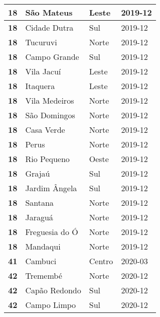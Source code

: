 \begin{table}[H]
\begin{tabular}{l|l|l|l}
	\textbf{18} & São Mateus & Leste & 2019-12\\ \hline
	\textbf{18} & Cidade Dutra & Sul & 2019-12\\ \hline
	\textbf{18} & Tucuruvi & Norte & 2019-12\\ \hline
	\textbf{18} & Campo Grande & Sul & 2019-12\\ \hline
	\textbf{18} & Vila Jacuí & Leste & 2019-12\\ \hline
	\textbf{18} & Itaquera & Leste & 2019-12\\ \hline
	\textbf{18} & Vila Medeiros & Norte & 2019-12\\ \hline
	\textbf{18} & São Domingos & Norte & 2019-12\\ \hline
	\textbf{18} & Casa Verde & Norte & 2019-12\\ \hline
	\textbf{18} & Perus & Norte & 2019-12\\ \hline
	\textbf{18} & Rio Pequeno & Oeste & 2019-12\\ \hline
	\textbf{18} & Grajaú & Sul & 2019-12\\ \hline
	\textbf{18} & Jardim Ângela & Sul & 2019-12\\ \hline
	\textbf{18} & Santana & Norte & 2019-12\\ \hline
	\textbf{18} & Jaraguá & Norte & 2019-12\\ \hline
	\textbf{18} & Freguesia do Ó & Norte & 2019-12\\ \hline
	\textbf{18} & Mandaqui & Norte & 2019-12\\ \hline
	\textbf{41} & Cambuci & Centro & 2020-03\\ \hline
	\textbf{42} & Tremembé & Norte & 2020-12\\ \hline
	\textbf{42} & Capão Redondo & Sul & 2020-12\\ \hline
	\textbf{42} & Campo Limpo & Sul & 2020-12\\	
	\end{tabular}
\end{table}

